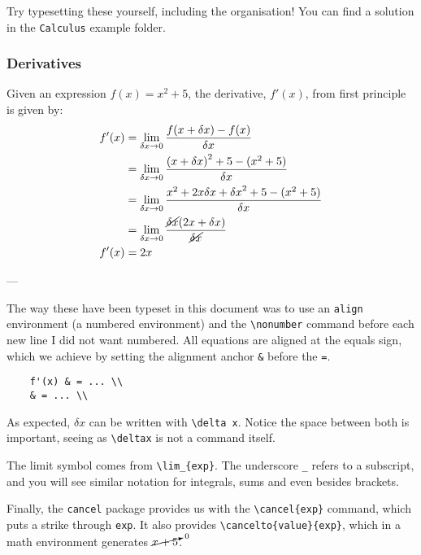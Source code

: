 Try typesetting these yourself, including the organisation! You can find a solution in the \texttt{Calculus} example folder.

\subsubsection{Derivatives}
Given an expression \( f(x) = x^2+5 \), the derivative, \( f'(x) \), from first principle is given by:
\begin{align}
    f'(x) &= \lim_{\delta x \to 0}
        \frac{
            f(x + \delta x) - f(x)
        }{ \delta x }
    \\
    &= \lim_{\delta x \to 0}
        \frac{
            {(x + \delta x)}^2+5 - (x^2+5)
        }{ \delta x }
    \nonumber \\
    &= \lim_{\delta x \to 0}
        \frac{
            x^2 + 2x\delta x + {\delta x}^2 +5 - (x^2+5)
        }{ \delta x }
    \nonumber \\
    &= \lim_{\delta x \to 0}
        \frac{
            \cancel{\delta x} (2x + \delta x)
        }{ \cancel{\delta x} }
    \nonumber \\
    f'(x) &= 2x 
\end{align}

---

The way these have been typeset in this document was to use an \verb|align| environment (a numbered environment) and the \verb|\nonumber| command before each new line I did not want numbered.
All equations are aligned at the equals sign, which we achieve by setting the alignment anchor \verb|&| before the \verb|=|.

\begin{lstlisting}
    f'(x) & = ... \\
    & = ... \\
\end{lstlisting} 

As expected, \( \delta x\) can be written with \verb|\delta x|. Notice the space between both is important, seeing as \verb|\deltax| is not a command itself.

The limit symbol comes from \verb|\lim_{exp}|. The underscore \verb|_| refers to a subscript, and you will see similar notation for integrals, sums and even besides brackets.

Finally, the \texttt{cancel} package provides us with the \verb|\cancel{exp}| command, which puts a strike through \verb|exp|.
It also provides \verb|\cancelto{value}{exp}|, which in a math environment generates \( \cancelto{0}{x+5} \).


